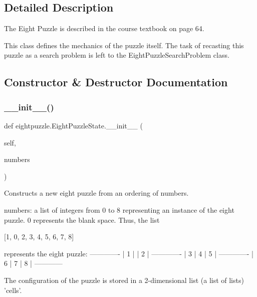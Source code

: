 \subsection{Detailed Description}
\begin{DoxyVerb}The Eight Puzzle is described in the course textbook on
page 64.

This class defines the mechanics of the puzzle itself.  The
task of recasting this puzzle as a search problem is left to
the EightPuzzleSearchProblem class.
\end{DoxyVerb}
 

\subsection{Constructor \& Destructor Documentation}
\mbox{\label{classeightpuzzle_1_1_eight_puzzle_state_a22373dfcbc8746448ef4eb2835694da4}} 
\subsubsection{\texorpdfstring{\+\_\+\+\_\+init\+\_\+\+\_\+()}{\_\_init\_\_()}}
{\footnotesize\ttfamily def eightpuzzle.\+Eight\+Puzzle\+State.\+\_\+\+\_\+init\+\_\+\+\_\+ (\begin{DoxyParamCaption}\item[{}]{self,  }\item[{}]{numbers }\end{DoxyParamCaption})}

\begin{DoxyVerb}  Constructs a new eight puzzle from an ordering of numbers.

numbers: a list of integers from 0 to 8 representing an
  instance of the eight puzzle.  0 represents the blank
  space.  Thus, the list

 [1, 0, 2, 3, 4, 5, 6, 7, 8]

  represents the eight puzzle:
 -------------
 | 1 |   | 2 |
 -------------
 | 3 | 4 | 5 |
 -------------
 | 6 | 7 | 8 |
 ------------

The configuration of the puzzle is stored in a 2-dimensional
list (a list of lists) 'cells'.
\end{DoxyVerb}
 

